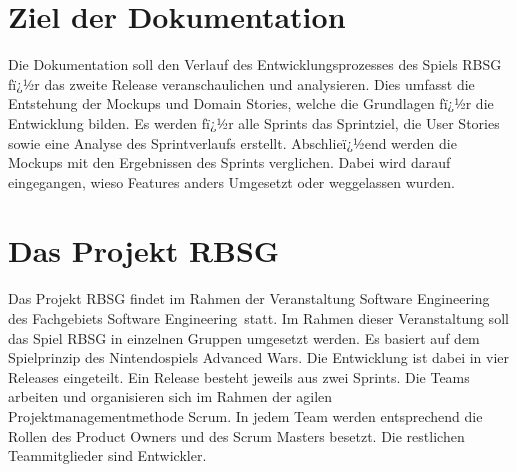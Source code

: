 \documentclass[12pt, titlepage]{scrartcl}
\newcommand{\RN}[1]{%
	\textup{\uppercase\expandafter{\romannumeral#1}}%
}
\begin{document}
	\section{Ziel der Dokumentation}
		Die Dokumentation soll den Verlauf des Entwicklungsprozesses des Spiels RBSG fï¿½r das zweite Release veranschaulichen und analysieren. Dies umfasst die Entstehung der Mockups und Domain Stories, welche die Grundlagen fï¿½r die Entwicklung bilden. Es werden fï¿½r alle Sprints das Sprintziel, die User Stories sowie eine Analyse des Sprintverlaufs erstellt. Abschlieï¿½end werden die Mockups mit den Ergebnissen des Sprints verglichen. Dabei wird darauf eingegangen, wieso Features anders Umgesetzt oder weggelassen wurden.
	\section{Das Projekt RBSG}
			Das Projekt RBSG findet im Rahmen der Veranstaltung Software Engineering \RN{1} des Fachgebiets Software Engineering\ statt. Im Rahmen dieser Veranstaltung soll das Spiel RBSG in einzelnen Gruppen umgesetzt werden. Es basiert auf dem Spielprinzip des Nintendospiels Advanced Wars. Die Entwicklung ist dabei in vier Releases eingeteilt. Ein Release besteht jeweils aus zwei Sprints. Die Teams arbeiten und organisieren sich im Rahmen der agilen Projektmanagementmethode Scrum. In jedem Team werden entsprechend die Rollen des Product Owners und des Scrum Masters besetzt. Die restlichen Teammitglieder sind Entwickler.
		
\end{document}
